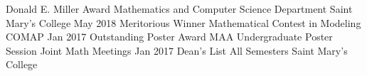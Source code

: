 \begin{cvhonors}
  \cvhonor
    {Donald E. Miller Award}
    {Mathematics and Computer Science Department}
    {Saint Mary's College}
    {May 2018}
  \cvhonor
    {Meritorious Winner}
    {Mathematical Contest in Modeling}
    {COMAP}
    {Jan 2017}
  \cvhonor
    {Outstanding Poster Award}
    {MAA Undergraduate Poster Session}
    {Joint Math Meetings}
    {Jan 2017}
  \cvhonor
    {Dean's List}
    {All Semesters}
    {Saint Mary's College}
    {}
\end{cvhonors}
